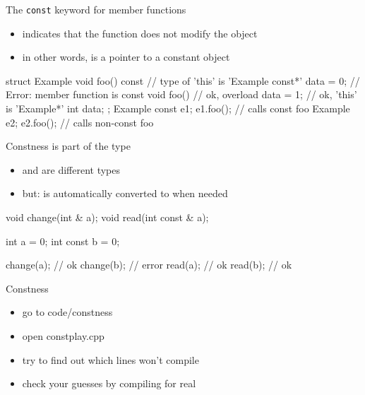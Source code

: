 \begin{frame}[fragile]
  \begin{block}{The \texttt{const} keyword for member functions}
    \begin{itemize}
    \item indicates that the function does not modify the object
    \item in other words,  is a pointer to a constant object
    \end{itemize}
  \end{block}
  \begin{cppcode}
    struct Example {
      void foo() const {
        // type of 'this' is 'Example const*'
        data = 0; // Error: member function is const
      }
      void foo() { // ok, overload
        data = 1;  // ok, 'this' is 'Example*'
      }
      int data;
    };
    Example const e1; e1.foo(); // calls     const foo
    Example       e2; e2.foo(); // calls non-const foo
  \end{cppcode}
\end{frame}

\begin{frame}[fragile]
  \begin{block}{Constness is part of the type}
    \begin{itemize}
    \item {} and  are different types
    \item but:  is automatically converted to  when needed
    \end{itemize}
  \end{block}
  \begin{cppcode}
    void change(int & a);
    void read(int const & a);

    int a = 0;
    int const b = 0;

    change(a); // ok
    change(b); // error
    read(a);   // ok
    read(b);   // ok
  \end{cppcode}
\end{frame}

\begin{frame}[fragile]
  \begin{exercise}{Constness}
    \begin{itemize}
    \item go to code/constness
    \item open constplay.cpp
    \item try to find out which lines won't compile
    \item check your guesses by compiling for real
    \end{itemize}
  \end{exercise}
\end{frame}
